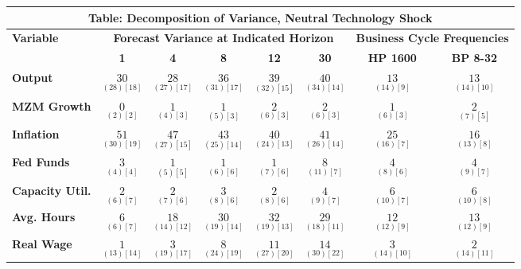 \documentclass{article}
\begin{document}
 \begin{tabular}{|l|c|@{}c|c|@{}c|c|@{}c|c|} 
 \hline 
 \multicolumn{8}{|c|}{\textbf{Table: Decomposition of Variance, Neutral Technology Shock}} \\ \hline 
 \textbf{Variable} & \multicolumn{5}{|c}{\textbf{Forecast Variance at 
 Indicated Horizon}} & \multicolumn{2}{|c|}{\textbf{Business Cycle 
 Frequencies}} \\ \cline{2-8} 
 & \textbf{1} & \textbf{4} & \textbf{8} & \textbf{12} & \textbf{30} & \textbf{%
 HP 1600} & \textbf{BP 8-32} \\ \hline\hline 
 \textbf{Output} & $\underset{( 28) [ 18]}{ 30}$ & $\underset{( 27) [ 17]}{ 28}$ & $\underset{( 31) [ 17]}{ 36}$ & $\underset{( 32) [ 15]}{ 39}$ & $\underset{( 34) [ 14]}{ 40}$ & $\underset{( 14) [  9]}{ 13}$ & $\underset{( 14) [ 10]}{ 13}$ \\ \hline 
 \textbf{MZM Growth} & $\underset{(  2) [  2]}{  0}$ & $\underset{(  4) [  3]}{  1}$ & $\underset{(  5) [  3]}{  1}$ & $\underset{(  6) [  3]}{  2}$ & $\underset{(  6) [  3]}{  2}$ & $\underset{(  6) [  3]}{  1}$ & $\underset{(  7) [  5]}{  2}$ \\ \hline 
 \textbf{Inflation} & $\underset{( 30) [ 19]}{ 51}$ & $\underset{( 27) [ 15]}{ 47}$ & $\underset{( 25) [ 14]}{ 43}$ & $\underset{( 24) [ 13]}{ 40}$ & $\underset{( 26) [ 14]}{ 41}$ & $\underset{( 16) [  7]}{ 25}$ & $\underset{( 13) [  8]}{ 16}$ \\ \hline 
 \textbf{Fed Funds} & $\underset{(  4) [  4]}{  3}$ & $\underset{(  5) [  5]}{  1}$ & $\underset{(  6) [  6]}{  1}$ & $\underset{(  7) [  6]}{  1}$ & $\underset{( 11) [  7]}{  8}$ & $\underset{(  8) [  6]}{  4}$ & $\underset{(  9) [  7]}{  4}$ \\ \hline 
 \textbf{Capacity Util.} & $\underset{(  6) [  7]}{  2}$ & $\underset{(  7) [  6]}{  2}$ & $\underset{(  8) [  6]}{  3}$ & $\underset{(  8) [  6]}{  2}$ & $\underset{(  9) [  7]}{  4}$ & $\underset{( 10) [  7]}{  6}$ & $\underset{( 10) [  8]}{  6}$ \\ \hline 
 \textbf{Avg. Hours} & $\underset{(  6) [  7]}{  6}$ & $\underset{( 14) [ 12]}{ 18}$ & $\underset{( 19) [ 14]}{ 30}$ & $\underset{( 19) [ 13]}{ 32}$ & $\underset{( 18) [ 11]}{ 29}$ & $\underset{( 12) [  9]}{ 12}$ & $\underset{( 12) [  9]}{ 13}$ \\ \hline 
 \textbf{Real Wage} &  $\underset{( 13) [ 14]}{  1}$ & $\underset{( 19) [ 17]}{  3}$ & $\underset{( 24) [ 19]}{  8}$ & $\underset{( 27) [ 20]}{ 11}$ & $\underset{( 30) [ 22]}{ 14}$ & $\underset{( 14) [ 10]}{  3}$ & $\underset{( 14) [ 11]}{  2}$ \\ \hline 

\end{tabular}
\end{document}
